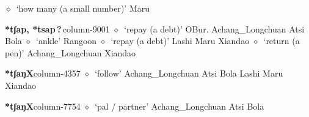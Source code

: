          $\diamond$~`how many (a small number)'
         Maru 
  \item {\footnotesize \textbf{*tʃap, *tsap\,?\,}}{\tiny column-9001}
         $\diamond$~`repay (a debt)'
         OBur. 
\hspace{1ex}
         Achang\_Longchuan 
\hspace{1ex}
         Atsi 
\hspace{1ex}
         Bola 
\hspace{1ex}
         $\diamond$~`ankle'
         Rangoon 
\hspace{1ex}
         $\diamond$~`repay (a debt)'
         Lashi 
\hspace{1ex}
         Maru 
\hspace{1ex}
         Xiandao 
\hspace{1ex}
         $\diamond$~`return (a pen)'
         Achang\_Longchuan 
\hspace{1ex}
         Xiandao 
  \item {\footnotesize \textbf{*tʃaŋX}}{\tiny column-4357}
         $\diamond$~`follow'
         Achang\_Longchuan 
\hspace{1ex}
         Atsi 
\hspace{1ex}
         Bola 
\hspace{1ex}
         Lashi 
\hspace{1ex}
         Maru 
\hspace{1ex}
         Xiandao 
  \item {\footnotesize \textbf{*tʃaŋX}}{\tiny column-7754}
         $\diamond$~`pal / partner'
         Achang\_Longchuan 
\hspace{1ex}
         Atsi 
\hspace{1ex}
         Bola 
